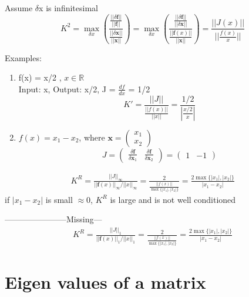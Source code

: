 \documentclass{article}
\begin{document}
Assume $\delta$x is infinitesimal
\begin{equation}
  K^2 = \max_{\delta x} \left(\frac{\frac{||\delta \mathbf{f}||}{||\mathbf{f}||}}{\frac{||\delta \mathbf{x}||}{||\mathbf{x}||}}\right)
  = \max_{\delta x} \left(\frac{\frac{||\delta \mathbf{f}||}{||\delta \mathbf{x}||}} {\frac{||\mathbf{f}(x)||}{||\mathbf{x}||}}\right)
  = \frac{||J(x)||}{||\frac{f(x)}{x}||}
\end{equation}

Examples:
\begin{enumerate}
\item f(x) = x/2 , $x \in \mathbb{R}$\\
  Input: x, Output: x/2, J = $\frac{df}{dx}$ = 1/2\\
  \[
    K' = \frac{||J||}{\frac{||f(x)||}{||x||}} = \frac{1/2}{|\frac{x/2}{x}|}
  \]
\item $f(x) = x_1 - x_2$, where $\mathbf{x} = \begin{pmatrix} x_1\\x_2 \end{pmatrix}$\\
  \[
    J = \begin{pmatrix}
          \frac{\delta\mathbf{f}}{\delta\mathbf{x}_1}
          &\frac{\delta\mathbf{f}}{\delta\mathbf{x}_2}
        \end{pmatrix}
      = \begin{pmatrix} 1&-1 \end{pmatrix}
  \]
\end{enumerate}

\[\begin{split}
    K^R = \frac{||J||_{\infty}}{||\mathbf{f}(x)||_{\infty}/||x||_{\infty}}
    = \frac{2}{\frac{||f(x)||}{\max\{|x_1|, |x_2|\}}}
    = \frac{2\max\{|x_1|, |x_2|\}}{|x_1 - x_2|}
\end{split}\]
if $|x_1 - x_2|$ is small $\approx 0$, $K^R$ is large and is not well conditioned

-----------------------Missing---
\[\begin{split}
    K^R = \frac{||J||_1}{||\mathbf{f}(x)||_1/||x||_1}
    = \frac{2}{\frac{||f(x)||}{\max\{|x_1|, |x_2|\}}}
    = \frac{2\max\{|x_1|, |x_2|\}}{|x_1 - x_2|}
\end{split}\]

\section*{Eigen values of a matrix}
\label{sec:eigen}
\end{document}
